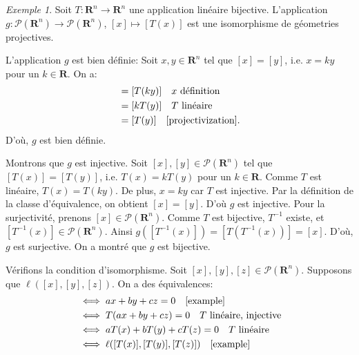 \documentclass[12pt, oneside]{memoir}
\theoremstyle{definition}
\theoremstyle{remark}
\newtheorem{exm}{Exemple}
\newcommand{\proj}{\boldsymbol{\mathscr{P}}}
\newcommand{\R}{\mathbf{R}}
\begin{document}
\begin{exm}
  Soit $T: \R^n \to \R^n$ une application linéaire
  bijective. L'application $g: \proj(\R^n) \to \proj(\R^n)$,
  $[x] \mapsto [T(x)]$ est une isomorphisme de géometries projectives.

  L'application $g$ est bien définie: Soit $x, y \in \R^n$ tel que
  $[x] = [y]$, i.e. $x = ky$ pour un $k \in \R$. On a:
  \begin{align*}
    [T(x)] &= [T(ky)] \quad x \ \text{définition} \\
           &= [kT(y)] \quad T \ \text{linéaire} \\
           &= [T(y)] \quad \text{\cref{projectivization}.}
  \end{align*}
  D'où, $g$ est bien définie.

  Montrons que $g$ est injective. Soit $[x], [y] \in \proj(\R^n)$ tel
  que $[T(x)] = [T(y)]$, i.e. $T(x) = kT(y)$ pour un $k \in \R$. Comme
  $T$ est linéaire, $T(x) = T(ky)$. De plus, $x = ky$ car $T$ est
  injective. Par la définition de la classe d'équivalence, on obtient
  $[x] = [y]$. D'où $g$ est injective. Pour la surjectivité, prenons
  $[x] \in \proj(\R^n)$. Comme $T$ est bijective, $T^{-1}$ existe, et
  $[T^{-1}(x)] \in \proj(\R^n)$. Ainsi
  $g([T^{-1}(x)]) = [T(T^{-1}(x))] = [x]$. D'où, $g$ est
  surjective. On a montré que $g$ est bijective.

  Vérifions la condition d'isomorphisme. Soit
  $[x], [y], [z] \in \proj(\R^n)$. Supposons que
  $\ell([x], [y], [z])$. On a des équivalences:
  \begin{align*}
    &\iff ax + by + cz = 0 \quad \text{\cref{example}} \\
    &\iff T(ax + by + cz) = 0 \quad T \ \text{linéaire, injective} \\
    &\iff aT(x) + bT(y) + cT(z) = 0 \quad T \ \text{linéaire} \\
    &\iff \ell([T(x)], [T(y)], [T(z)]) \quad \text{\cref{example}}
  \end{align*}
\end{exm}
\end{document}
